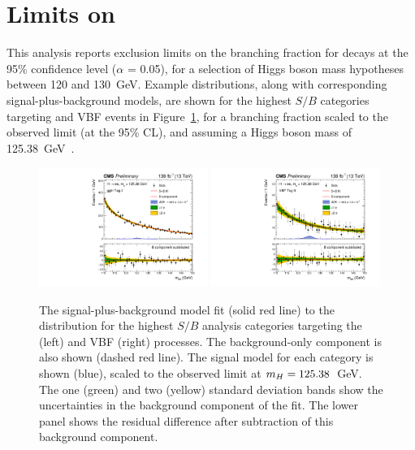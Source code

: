 \section{Limits on \BHee}

This analysis reports exclusion limits on the branching fraction for \Hee decays at the 95\% confidence level ($\alpha$ = 0.05), for a selection of Higgs boson mass hypotheses between 120 and 130~GeV. Example \mee distributions, along with corresponding signal-plus-background models, are shown for the highest $S/B$ categories targeting \ggH and VBF events in Figure~\ref{fig:hee_S_plus_B_plots}, for a \Hee branching fraction scaled to the observed limit (at the 95\% CL), and assuming a Higgs boson mass of 125.38~GeV~\cite{CMS_Hgg_Hmass}. 

\begin{figure}[htbp!]
\centering
\includegraphics[width=0.49\textwidth]{Figures/Hee/Results/SPlusBModels/gghcat0_CMS_hgg_mass.pdf}\hfill%
\includegraphics[width=0.49\textwidth]{Figures/Hee/Results/SPlusBModels/vbfcat0_CMS_hgg_mass.pdf}\hfill%
\caption[The observed dielectron invariant mass distribution for the \ggH Tag 0 and VBF Tag 0 analysis categories.]{The signal-plus-background model fit (solid red line) to the \mee distribution for the highest $S/B$ analysis categories targeting the \ggH (left) and VBF (right) processes. The background-only component is also shown (dashed red line). The signal model for each category is shown (blue), scaled to the observed limit at $m_{H}=125.38$~GeV. The one (green) and two (yellow) standard deviation bands show the uncertainties in the background component of the fit. The lower panel shows the residual difference after subtraction of this background component.}
\label{fig:hee_S_plus_B_plots}
\end{figure}

